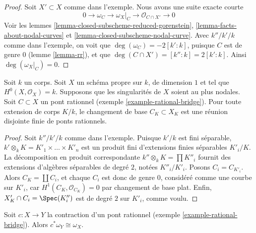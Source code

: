 \begin{proof}
Soit $X' \subset X$ comme dans l'exemple. Nous avons une suite exacte courte $$
0 \to \omega_C \to \omega_X|_C \to \mathcal{O}_{C \cap X'} \to 0
$$ Voir les lemmes \ref{lemma-closed-subscheme-reduced-gorenstein}, \ref{lemma-facts-about-nodal-curves} et \ref{lemma-closed-subscheme-nodal-curve}. Avec $k''/k'/k$ comme dans l'exemple, on voit que $\deg(\omega_C) = -2[k' : k]$, puisque $C$ est de genre $0$ (lemme \ref{lemma-rr}), et que $\deg(C \cap X') = [k'' : k] = 2[k' : k]$. Ainsi $\deg(\omega_X|_C) = 0$.
\end{proof}

\begin{lemma}
\label{lemma-rational-bridge-field-extension}
Soit $k$ un corps. Soit $X$ un schéma propre sur $k$, de dimension $1$ et tel que $H^0(X, \mathcal{O}_X) = k$. Supposons que les singularités de $X$ soient au plus nodales. Soit $C \subset X$ un pont rationnel (exemple \ref{example-rational-bridge}). Pour toute extension de corps $K/k$, le changement de base $C_K \subset X_K$ est une réunion disjointe finie de ponts rationnels.
\end{lemma}

\begin{proof}
Soit $k''/k'/k$ comme dans l'exemple. Puisque $k'/k$ est fini séparable, $k' \otimes_k K = K'_1 \times \ldots \times K'_n$ est un produit fini d'extensions finies séparables $K'_i/K$. La décomposition en produit correspondante $k'' \otimes_k K = \prod K''_i$ fournit des extensions d'algèbres séparables de degré $2$, notées $K''_i/K'_i$. Posons $C_i = C_{K'_i}$. Alors $C_K = \coprod C_i$, et chaque $C_i$ est donc de genre $0$, considéré comme une courbe sur $K'_i$, car $H^1(C_K, \mathcal{O}_{C_K}) = 0$ par changement de base plat. Enfin, $X'_K \cap C_i = \Spec(K''_i)$ est de degré $2$ sur $K'_i$, comme voulu.
\end{proof}

\begin{lemma}
\label{lemma-rational-bridge-canonical}
Soit $c : X \to Y$ la contraction d'un pont rationnel (exemple \ref{example-rational-bridge}). Alors $c^*\omega_Y \cong \omega_X$.
\end{lemma}


